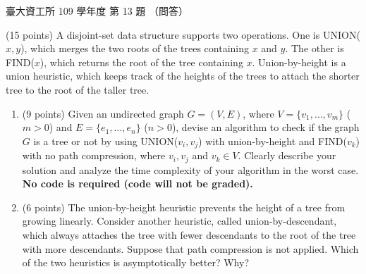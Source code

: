 \begin{pastexam}[label={px:ntu-109-dsaa-13}]{臺大資工所 109 學年度 第 13 題}
（問答）

(15 points) A disjoint-set data structure supports two operations. One is UNION($x,y$), which
merges the two roots of the trees containing $x$ and $y$. The other is FIND($x$), which returns
the root of the tree containing $x$. Union-by-height is a union heuristic, which keeps track of
the heights of the trees to attach the shorter tree to the root of the taller tree.
\begin{enumerate}[label=(\alph*)]
\item (9 points) Given an undirected graph $G=(V,E)$, where $V=\{v_1,\ldots,v_m\}$ ($m>0$) and
$E=\{e_1,\ldots,e_n\}$ ($n>0$), devise an algorithm to check if the graph $G$ is a tree or not by
using UNION($v_i,v_j$) with union-by-height and FIND($v_k$) with no path compression, where
$v_i,v_j$ and $v_k\in V$. Clearly describe your solution and analyze the time complexity of your
algorithm in the worst case. \textbf{No code is required (code will not be graded).}
\item (6 points) The union-by-height heuristic prevents the height of a tree from growing
linearly. Consider another heuristic, called union-by-descendant, which always attaches the tree
with fewer descendants to the root of the tree with more descendants. Suppose that path
compression is not applied. Which of the two heuristics is asymptotically better? Why?
\end{enumerate}
\end{pastexam}

